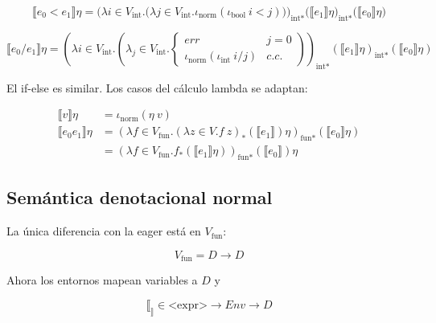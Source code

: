 \documentclass[article, 12pt]{article}
\begin{document}
\begin{equation*}
  \llbracket e_0 < e_1 \rrbracket\eta = \Big( \lambda i \in V_{\text{int}}.
  \big( \lambda j \in V_{\text{int}}. \iota_{\text{norm}}(\iota_{\text{bool}} ~
i < j) \big) \Big)_{\text{int}*} \big( \llbracket e_1 \rrbracket\eta
\big)_{\text{int}*} \big( \llbracket e_0 \rrbracket\eta \big)
\end{equation*}

\begin{equation*}
  \llbracket e_0 / e_1 \rrbracket\eta = \left( \lambda i \in V_{\text{int}}.
  \left( \lambda_j \in V_{\text{int}}. \begin{cases}
      err & j = 0 \\ 
      \iota_{\text{norm}}(\iota_{\text{int}}~ i/j) & c.c.
\end{cases} \right)  \right)_{\text{int}*} \left( \llbracket e_1 \rrbracket\eta
\right)_{\text{int}*} \left( \llbracket e_0 \rrbracket\eta \right) 
\end{equation*}

El if-else es similar. Los casos del cálculo lambda se adaptan:

\begin{align*}
  \llbracket v \rrbracket\eta &= \iota_{\text{norm}}(\eta ~ v) \\ 
  \llbracket e_0 e_1 \rrbracket\eta &= (\lambda f \in V_{\text{fun}}.(\lambda z
  \in V . f ~ z)_*(\llbracket e_1 \rrbracket)\eta)_{\text{fun}*}(\llbracket e_0
  \rrbracket\eta)\\ 
&= (\lambda f \in V_{\text{fun}}.f_*(\llbracket
e_1\rrbracket\eta))_{\text{fun*}}(\llbracket e_0 \rrbracket)\eta
\end{align*}



\subsection{Semántica denotacional normal}

La única diferencia con la eager está en $V_{\text{fun}}$: 

\begin{equation*}
  V_{\text{fun}} = D \to D
\end{equation*}

Ahora los entornos mapean variables a $D$ y 

\begin{equation*}
  \llbracket _ \rrbracket \in \text{<expr>} \to Env \to D
\end{equation*}
\end{document}
